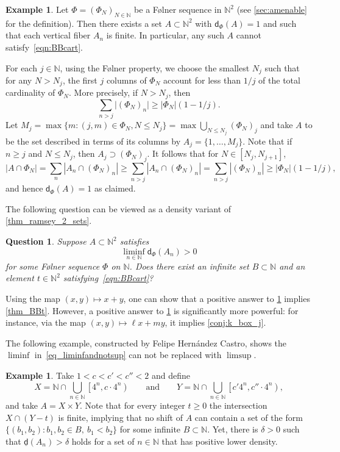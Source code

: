 \documentclass[10pt,dvipsnames]{article}
\newtheorem{question}[theorem]{Question}
\theoremstyle{definition}
\newtheorem{example}[theorem]{Example}
\theoremstyle{plain}
\newcommand{\N}{\mathbb{N}}
\newcommand{\dens}{\mathsf{d}}
\newcommand{\ldens}{\underline{\mathsf{d}}}
\newcommand{\Folner}{F\o{}lner}
\begin{document}
\begin{example}
Let $\Phi=(\Phi_N)_{N\in\N}$ be a \Folner{} sequence  in $\N^2$ (see \cref{sec:amenable} for the definition).
Then there exists a set $A\subset\N^2$ with $\dens_\Phi(A)=1$ and such that each vertical fiber $A_n$ is finite.
In particular, any such $A$ cannot satisfy~\eqref{eqn:BBcart}.

For each $j\in\N$, using the F\o lner property, we choose the smallest $N_j$ such that for any $N>N_j$, the first $j$ columns of $\Phi_N$ account for less than $1/j$ of the total cardinality of $\Phi_N$. More precisely, if $N> N_j$, then 
\begin{equation*}\label{eq_folnersequencesestimate}
    \sum_{n>j}\big|(\Phi_N)_n\big|\geq|\Phi_N|(1-1/j).
\end{equation*}
Let $M_j=\max\{m:(j,m)\in\Phi_N,N\leq N_j\}=\max\bigcup_{N\leq N_j}(\Phi_N)_j$ and take $A$ to be the set described  in terms of its columns by $A_j=\{1,\dots,M_j\}$.
Note that if $n\geq j$ and $N\leq N_j$, then $A_j\supset(\Phi_N)_j$.
It follows that for $N\in[N_j,N_{j+1}]$,
$$|A\cap\Phi_N|=\sum_n|A_n\cap(\Phi_N)_n|\geq\sum_{n>j}|A_n\cap(\Phi_N)_n|=\sum_{n>j}|(\Phi_N)_n|\geq|\Phi_N|(1-1/j),$$
and hence $\dens_\Phi(A)=1$ as claimed.
\end{example}


The following question can be viewed as a density variant of \cref{thm_ramsey_2_sets}.

\begin{question}
\label{q_bxbxt2}
Suppose $A\subset\N^2$ satisfies
\begin{equation}
    \label{eq_liminfandnotsup}
\liminf_{n\in\N} \dens_\Phi(A_n) >0
\end{equation}
for some \Folner{} sequence $\Phi$ on $\N$. 
Does there exist an infinite set $B\subset\N$ and an element $t\in\N^2$ satisfying~\eqref{eqn:BBcart}?
\end{question}

Using the map $(x,y) \mapsto x+y$, one can show that a positive answer to \cref{q_bxbxt2} implies \cref{thm_BBt}.
However, a positive answer to \cref{q_bxbxt2} is significantly more powerful:  for instance, via the map $(x,y) \mapsto \ell x + my$, it  implies \cref{conj:k_box_j}.


The following example, constructed by Felipe Hern\'andez Castro,
shows the $\liminf$ in~\eqref{eq_liminfandnotsup} can not be replaced with $\limsup$.


\begin{example}
\label{ex_felipe}
Take $1<c<c'<c''<2$ and define
\[
X=\N \cap \bigcup_{n\in\N}\left[4^{n},c\cdot4^{n}\right)
\qquad\text{and}\qquad
Y=\N \cap \bigcup_{n\in\N}\left[c'4^{n},c''\cdot4^{n}\right),
\]
and take $A=X\times Y$. Note that for every integer $t\geq 0$ the intersection $X\cap (Y-t)$ is finite, implying that no shift of $A$ can contain a set of the form $\{(b_1,b_2): b_1,b_2\in B,~b_1<b_2\}$ for some infinite $B \subset \N$. Yet, there is $\delta>0$ such that $\ldens(A_n)>\delta$ holds for a set of $n\in\N$ that has positive lower density. 
\end{example}
\end{document}
